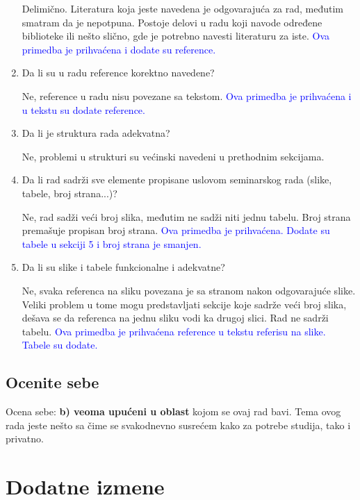 \documentclass[a4paper]{report}
\newcommand{\odgovor}[1]{\textcolor{blue}{#1}}
\begin{document}
\begin{enumerate}
Delimično. Literatura koja jeste navedena je odgovarajuća za rad, međutim smatram da je nepotpuna. Postoje delovi u radu koji navode određene biblioteke ili nešto slično, gde je potrebno navesti literaturu za iste.
\odgovor{Ova primedba je prihvaćena i dodate su reference.}
\item Da li su u radu reference korektno navedene?\par
Ne, reference u radu nisu povezane sa tekstom.
\odgovor{Ova primedba je prihvaćena i u tekstu su dodate reference.}
\item Da li je struktura rada adekvatna?\par
Ne, problemi u strukturi su većinski navedeni u prethodnim sekcijama.
\item Da li rad sadrži sve elemente propisane uslovom seminarskog rada (slike, tabele, broj strana...)?\par
Ne, rad sadži veći broj slika, međutim ne sadži niti jednu tabelu. Broj strana premašuje propisan broj strana.
\odgovor{Ova primedba je prihvaćena. Dodate su tabele u sekciji 5 i broj strana je smanjen.}
\item Da li su slike i tabele funkcionalne i adekvatne?\par
Ne, svaka referenca na sliku povezana je sa stranom nakon odgovarajuće slike. Veliki problem u tome mogu predstavljati sekcije koje sadrže veći broj slika, dešava se da referenca na jednu sliku vodi ka drugoj slici. Rad ne sadrži tabelu.
\odgovor{Ova primedba je prihvaćena reference u tekstu referisu na slike. Tabele su dodate.}
\end{enumerate}

\section{Ocenite sebe}
Ocena sebe: \textbf{b) veoma upućeni u oblast} kojom se ovaj rad bavi. Tema ovog rada jeste nešto sa čime se svakodnevno susrećem kako za potrebe studija, tako i privatno.



\chapter{Dodatne izmene}
\end{document}

